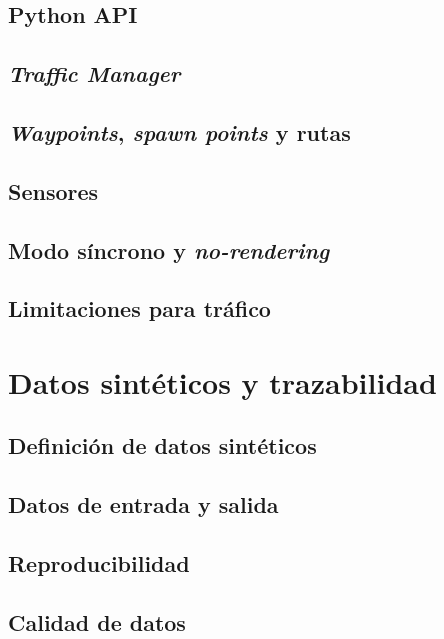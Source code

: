\subsection{Python API}

\subsection{\textit{Traffic Manager}}

\subsection{\textit{Waypoints}, \textit{spawn points} y rutas}

\subsection{Sensores}

\subsection{Modo síncrono y \textit{no-rendering}}

\subsection{Limitaciones para tráfico}

\section{Datos sintéticos y trazabilidad}

\subsection{Definición de datos sintéticos}

\subsection{Datos de entrada y salida}

\subsection{Reproducibilidad}

\subsection{Calidad de datos}

